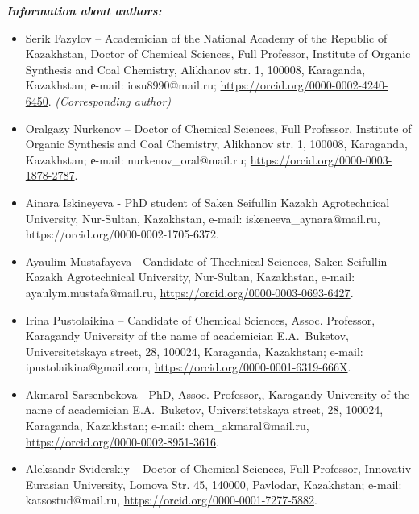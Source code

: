 \emph{{\bfseries Information about authors:}}

\begin{itemize}
\item
Serik Fazylov -- Academician of the National Academy of the Republic of
Kazakhstan, Doctor of Chemical Sciences, Full Professor, Institute of
Organic Synthesis and Coal Chemistry, Alikhanov str. 1, 100008,
Karaganda, Kazakhstan; е-mail:
iosu8990@mail.ru;
\href{https://orcid.org/0000-0002-4240-6450}{https://orcid.org/0000-0002-4240-6450}. \emph{(Corresponding
author)}

\item
Oralgazy Nurkenov -- Doctor of Chemical Sciences, Full Professor,
Institute of Organic Synthesis and Coal Chemistry, Alikhanov str. 1,
100008, Karaganda, Kazakhstan; е-mail:
nurkenov\_oral@mail.ru;
\href{https://orcid.org/0000-0003-1878-2787}{https://orcid.org/0000-0003-1878-2787}.

\item
Ainara Iskineyeva - PhD student of Saken Seifullin Kazakh Agrotechnical
University, Nur-Sultan, Kazakhstan, e-mail: iskeneeva\_aynara@mail.ru,
https://orcid.org/0000-0002-1705-6372.

\item
Ayaulim Mustafayeva - Candidate of Thechnical Sciences, Saken Seifullin
Kazakh Agrotechnical University, Nur-Sultan, Kazakhstan, e-mail:
ayaulym.mustafa@mail.ru,
\href{https://orcid.org/0000-0003-0693-6427}{https://orcid.org/0000-0003-0693-6427}.

\item
Irina Pustolaikina -- Candidate of Chemical Sciences, Assoc. Professor,
Karagandy University of the name of academician E.A.~Buketov,
Universitetskaya street, 28, 100024, Karaganda, Kazakhstan; e-mail:
ipustolaikina@gmail.com,
\href{https://orcid.org/0000-0001-6319-666X}{https://orcid.org/0000-0001-6319-666X}.

\item
Akmaral Sarsenbekova - PhD, Assoc. Professor,, Karagandy University of
the name of academician E.A.~Buketov, Universitetskaya street, 28,
100024, Karaganda, Kazakhstan; e-mail:
chem\_akmaral@mail.ru,
\href{https://orcid.org/0000-0002-8951-3616}{https://orcid.org/0000-0002-8951-3616}.

\item
Aleksandr Sviderskiy -- Doctor of Chemical Sciences, Full Professor,
Innovativ Eurasian University, Lomova Str. 45, 140000, Pavlodar,
Kazakhstan; e-mail:
katsostud@mail.ru,
\href{https://orcid.org/0000-0001-7277-5882}{https://orcid.org/0000-0001-7277-5882}.
\end{itemize}
